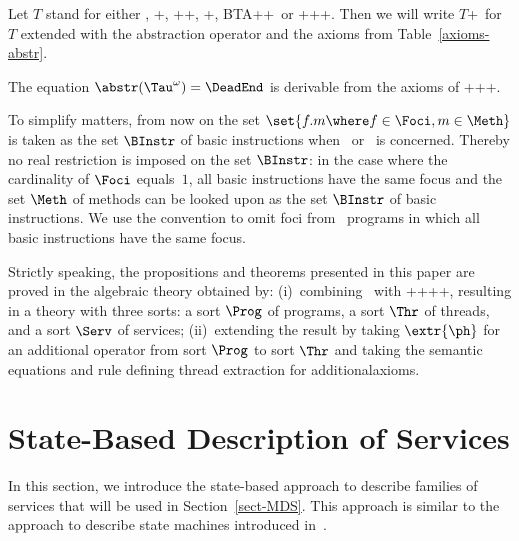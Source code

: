 \documentclass[fleqn]{llncs}
\begin{document}
Let $T$ stand for either \BTA, \BTA+\REC, \BTA+\REC+\AIP, \BTA+\TSI,
BTA+\REC+\TSI\ or \BTA+\REC+\AIP+\TSI.
Then we will write $T$+\ABSTR\ for $T$ extended with the abstraction
operator and the axioms from Table~\ref{axioms-abstr}.

The equation $\abstr(\Tau^\omega) = \DeadEnd$ is derivable from the
axioms of \BTA+\REC+\linebreak[2]\AIP+\ABSTR.

To simplify matters, from now on the set
$\set{f.m \where f \in \Foci, m \in \Meth}$
is taken as the set $\BInstr$ of basic instructions when \PGA\ or \PGLD\
is concerned.
Thereby no real restriction is imposed on the set $\BInstr$: in the case
where the cardinality of $\Foci$ equals~$1$, all basic instructions have
the same focus and the set $\Meth$ of methods can be looked upon as the
set $\BInstr$ of basic instructions.
We use the convention to omit foci from \PGA\ programs in which all
basic instructions have the same focus.

Strictly speaking, the propositions and theorems presented in this paper
are proved in the algebraic theory obtained by:
(i)~combining \PGA\ with \BTA+\REC+\AIP+\TSI+\ABSTR, resulting in a
theory with three sorts: a sort $\Prog$ of programs, a sort $\Thr$ of
threads, and a sort $\Serv$ of services;
(ii)~extending the result by taking $\extr{\ph}$ for an additional
operator from sort $\Prog$ to sort $\Thr$ and taking the semantic
equations and rule defining thread extraction for
additional\linebreak[2] axioms.


\section{State-Based Description of Services}
\label{sect-service-descr}

In this section, we introduce the state-based approach to describe
families of services that will be used in Section~\ref{sect-MDS}.
This approach is similar to the approach to describe state machines
introduced in~\cite{BP02a}.
\end{document}
